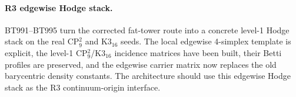 \paragraph{R3 edgewise Hodge stack.}
BT991--BT995 turn the corrected fat-tower route into a concrete level-1 Hodge
stack on the real CP\(^2_9\) and K3\(_{16}\) seeds.  The local edgewise 4-simplex
template is explicit, the level-1 CP\(^2_9\)/K3\(_{16}\) incidence matrices have
been built, their Betti profiles are preserved, and the edgewise carrier matrix
now replaces the old barycentric density constants.  The architecture should use
this edgewise Hodge stack as the R3 continuum-origin interface.
